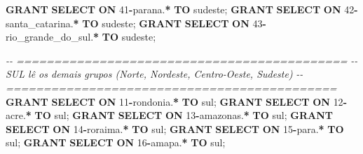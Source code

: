 \documentclass[
]{book}
\newenvironment{Shaded}{\begin{snugshade}}{\end{snugshade}}
\newcommand{\CommentTok}[1]{\textcolor[rgb]{0.56,0.35,0.01}{\textit{#1}}}
\newcommand{\DecValTok}[1]{\textcolor[rgb]{0.00,0.00,0.81}{#1}}
\newcommand{\KeywordTok}[1]{\textcolor[rgb]{0.13,0.29,0.53}{\textbf{#1}}}
\newcommand{\NormalTok}[1]{#1}
\newcommand{\OperatorTok}[1]{\textcolor[rgb]{0.81,0.36,0.00}{\textbf{#1}}}
\newcommand{\StringTok}[1]{\textcolor[rgb]{0.31,0.60,0.02}{#1}}
\begin{document}
\begin{Shaded}
\begin{Highlighting}[]
\KeywordTok{GRANT} \KeywordTok{SELECT} \KeywordTok{ON}\NormalTok{ \textasciigrave{}}\DecValTok{41}\OperatorTok{{-}}\NormalTok{parana\textasciigrave{}.}\OperatorTok{*}            \KeywordTok{TO} \StringTok{\textquotesingle{}sudeste\textquotesingle{}}\NormalTok{;}
\KeywordTok{GRANT} \KeywordTok{SELECT} \KeywordTok{ON}\NormalTok{ \textasciigrave{}}\DecValTok{42}\OperatorTok{{-}}\NormalTok{santa\_catarina\textasciigrave{}.}\OperatorTok{*}    \KeywordTok{TO} \StringTok{\textquotesingle{}sudeste\textquotesingle{}}\NormalTok{;}
\KeywordTok{GRANT} \KeywordTok{SELECT} \KeywordTok{ON}\NormalTok{ \textasciigrave{}}\DecValTok{43}\OperatorTok{{-}}\NormalTok{rio\_grande\_do\_sul\textasciigrave{}.}\OperatorTok{*} \KeywordTok{TO} \StringTok{\textquotesingle{}sudeste\textquotesingle{}}\NormalTok{;}

\CommentTok{{-}{-} ============================================}
\CommentTok{{-}{-} SUL lê os demais grupos (Norte, Nordeste, Centro{-}Oeste, Sudeste)}
\CommentTok{{-}{-} ============================================}
\KeywordTok{GRANT} \KeywordTok{SELECT} \KeywordTok{ON}\NormalTok{ \textasciigrave{}}\DecValTok{11}\OperatorTok{{-}}\NormalTok{rondonia\textasciigrave{}.}\OperatorTok{*}           \KeywordTok{TO} \StringTok{\textquotesingle{}sul\textquotesingle{}}\NormalTok{;}
\KeywordTok{GRANT} \KeywordTok{SELECT} \KeywordTok{ON}\NormalTok{ \textasciigrave{}}\DecValTok{12}\OperatorTok{{-}}\NormalTok{acre\textasciigrave{}.}\OperatorTok{*}               \KeywordTok{TO} \StringTok{\textquotesingle{}sul\textquotesingle{}}\NormalTok{;}
\KeywordTok{GRANT} \KeywordTok{SELECT} \KeywordTok{ON}\NormalTok{ \textasciigrave{}}\DecValTok{13}\OperatorTok{{-}}\NormalTok{amazonas\textasciigrave{}.}\OperatorTok{*}           \KeywordTok{TO} \StringTok{\textquotesingle{}sul\textquotesingle{}}\NormalTok{;}
\KeywordTok{GRANT} \KeywordTok{SELECT} \KeywordTok{ON}\NormalTok{ \textasciigrave{}}\DecValTok{14}\OperatorTok{{-}}\NormalTok{roraima\textasciigrave{}.}\OperatorTok{*}            \KeywordTok{TO} \StringTok{\textquotesingle{}sul\textquotesingle{}}\NormalTok{;}
\KeywordTok{GRANT} \KeywordTok{SELECT} \KeywordTok{ON}\NormalTok{ \textasciigrave{}}\DecValTok{15}\OperatorTok{{-}}\NormalTok{para\textasciigrave{}.}\OperatorTok{*}               \KeywordTok{TO} \StringTok{\textquotesingle{}sul\textquotesingle{}}\NormalTok{;}
\KeywordTok{GRANT} \KeywordTok{SELECT} \KeywordTok{ON}\NormalTok{ \textasciigrave{}}\DecValTok{16}\OperatorTok{{-}}\NormalTok{amapa\textasciigrave{}.}\OperatorTok{*}              \KeywordTok{TO} \StringTok{\textquotesingle{}sul\textquotesingle{}}\NormalTok{;}

\end{Highlighting}
\end{Shaded}
\end{document}
